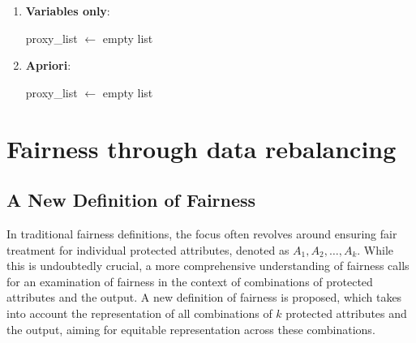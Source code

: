 \documentclass[12pt,a4paper,openright,twoside]{book}
\begin{document}
\begin{enumerate}
    \item \textbf{Variables only}: 
            
\begin{algorithm}[H]
    proxy\_list $\gets$ empty list\;
\end{algorithm}

    \item \textbf{Apriori}:

    \begin{algorithm}[H]
    proxy\_list $\gets$ empty list\;
\end{algorithm}
\end{enumerate}
\newpage

\section{Fairness through data rebalancing}
\subsection{A New Definition of Fairness}

In traditional fairness definitions, the focus often revolves around ensuring fair treatment for individual protected attributes, denoted as $A_1, A_2, \ldots, A_k$. While this is undoubtedly crucial, a more comprehensive understanding of fairness calls for an examination of fairness in the context of combinations of protected attributes and the output. A new definition of fairness is proposed, which takes into account the representation of all combinations of $k$ protected attributes and the output, aiming for equitable representation across these combinations.
\end{document}
